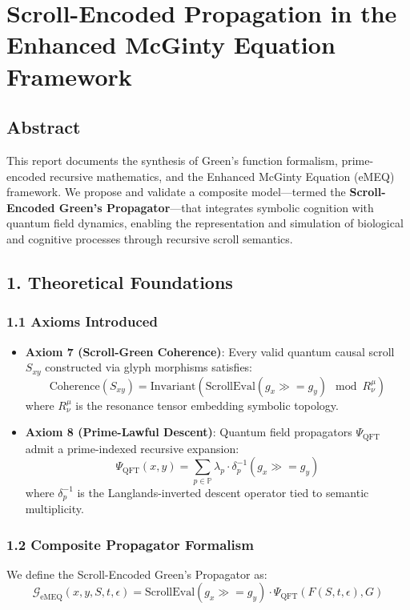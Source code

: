 \documentclass[12]{amsart}
\theoremstyle{plain}
\begin{document}
\section{Scroll-Encoded Propagation in the Enhanced McGinty Equation Framework}

\subsection{Abstract}
This report documents the synthesis of Green's function formalism, prime-encoded recursive mathematics, and the Enhanced McGinty Equation (eMEQ) framework. We propose and validate a composite model—termed the \textbf{Scroll-Encoded Green's Propagator}—that integrates symbolic cognition with quantum field dynamics, enabling the representation and simulation of biological and cognitive processes through recursive scroll semantics.

\subsection{1. Theoretical Foundations}

\subsubsection{1.1 Axioms Introduced}

\begin{itemize}
  \item \textbf{Axiom 7 (Scroll-Green Coherence)}: Every valid quantum causal scroll $S_{xy}$ constructed via glyph morphisms satisfies:
  \[
  \text{Coherence}(S_{xy}) = \text{Invariant}(\text{ScrollEval}(g_x \gg= g_y) \mod R^\mu_\nu)
  \]
  where $R^\mu_\nu$ is the resonance tensor embedding symbolic topology.

  \item \textbf{Axiom 8 (Prime-Lawful Descent)}: Quantum field propagators $\Psi_{\text{QFT}}$ admit a prime-indexed recursive expansion:
  \[
  \Psi_{\text{QFT}}(x, y) = \sum_{p \in \mathbb{P}} \lambda_p \cdot \delta^{-1}_p(g_x \gg= g_y)
  \]
  where $\delta^{-1}_p$ is the Langlands-inverted descent operator tied to semantic multiplicity.
\end{itemize}

\subsubsection{1.2 Composite Propagator Formalism}

We define the Scroll-Encoded Green's Propagator as:
\[
\mathcal{G}_{\text{eMEQ}}(x, y, S, t, \epsilon) = \text{ScrollEval}(g_x \gg= g_y) \cdot \Psi_{\text{QFT}}(F(S,t,\epsilon), G)
\]
\end{document}
